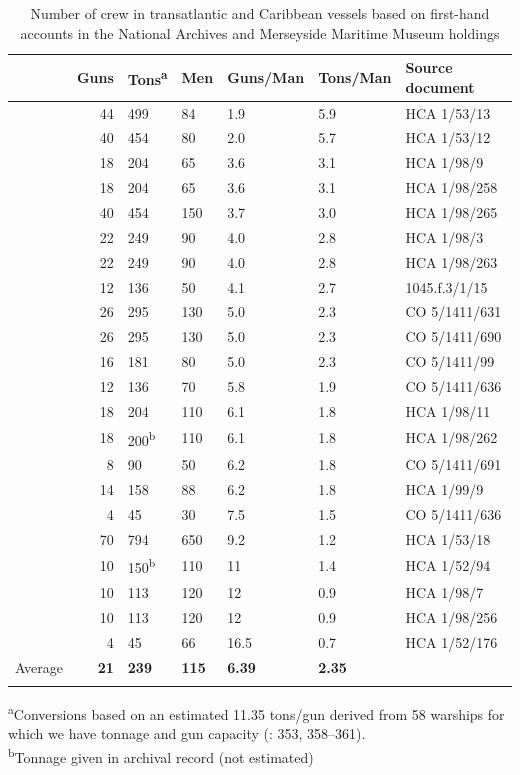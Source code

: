 \begin{table}
\caption{\label{tab:key:3.4} Number of crew in transatlantic and Caribbean vessels based on first-hand accounts in the National Archives and Merseyside Maritime Museum holdings}
\footnotesize
\begin{tabularx}{\textwidth}{lrYYYYl}
\lsptoprule

& \textbf{Guns} &  \textbf{Tons}\textsuperscript{a} &  \textbf{Men} & \textbf{Guns/Man} & \textbf{Tons/Man} & \textbf{Source document}\\
 \midrule
& 44 &  499 &  84 & 1.9 & 5.9 & HCA 1/53/13\\
& 40 &  454 &  80 & 2.0 & 5.7 & HCA 1/53/12\\
& 18 &  204 &  65 & 3.6 & 3.1 & HCA 1/98/9 \\
& 18 &  204 &  65 & 3.6 & 3.1 & HCA 1/98/258\\
& 40 &  454 &  150 & 3.7 & 3.0 & HCA 1/98/265\\
& 22 &  249 &  90 & 4.0 & 2.8 & HCA 1/98/3\\
& 22 &  249 &  90 & 4.0 & 2.8 & HCA 1/98/263\\
& 12 &  136 &  50 & 4.1 & 2.7 & 1045.f.3/1/15\\
& 26 &  295 &  130 & 5.0 & 2.3 & CO 5/1411/631\\
& 26 &  295 &  130 & 5.0 & 2.3 & CO 5/1411/690\\
& 16 &  181 &  80 & 5.0 & 2.3 & CO 5/1411/99\\
& 12 &  136 &  70 & 5.8 & 1.9 & CO 5/1411/636\\
& 18 &  204 &  110 & 6.1 & 1.8 & HCA 1/98/11\\
& 18 &  200\textsuperscript{b} &  110 & 6.1 & 1.8 & HCA 1/98/262\\
& 8 &  90 &  50 & 6.2 & 1.8 & CO 5/1411/691\\
& 14 &  158 &  88 & 6.2 & 1.8 & HCA 1/99/9\\
& 4 &  45 &  30 & 7.5 & 1.5 & CO 5/1411/636\\
& 70 &  794 &  650 & 9.2 & 1.2 & HCA 1/53/18\\
& 10 &  150\textsuperscript{b} &  110 & 11 & 1.4 & HCA 1/52/94\\
& 10 &  113 &  120 & 12 & 0.9 & HCA 1/98/7\\
& 10 &  113 &  120 & 12 & 0.9 & HCA 1/98/256\\
& 4 &  45 &  66 & 16.5 & 0.7 & HCA 1/52/176\\
 \midrule 
Average &  \textbf{21} &  \textbf{239} &  \textbf{115} & \textbf{6.39} & \textbf{2.35} & \\
\lspbottomrule
\end{tabularx}
\parbox{.95\textwidth}{\footnotesize
\textsuperscript{a}Conversions based on an estimated 11.35 tons/gun derived from 58 warships for which we have tonnage and gun capacity (\citealt{Bicheno2012}: 353, 358–361). \\
\textsuperscript{b}Tonnage given in archival record (not estimated)
}
\end{table}

